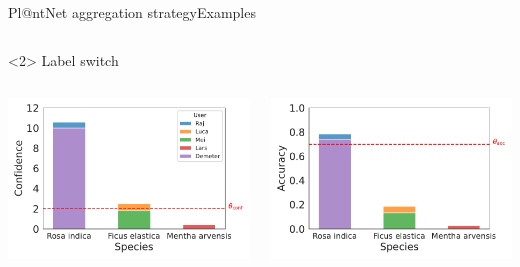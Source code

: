 \begin{frame}{Pl@ntNet aggregation strategy}{Examples}
\begin{onlyenv}
\begin{columns}
\begin{column}{.5\textwidth}
\begin{center}
                \end{center}
            \end{column}
        \end{columns}
    \end{onlyenv}
    \begin{onlyenv}<2>
        Label switch
        \begin{columns}
            \begin{column}{.5\textwidth}
                \begin{center}
                    \includegraphics[width=\textwidth]{./images/histplot_conf_switch.pdf}
                \end{center}
            \end{column}
            \begin{column}{.5\textwidth}
                \begin{center}
                    \includegraphics[width=\textwidth]{./images/histplot_acc_switch.pdf}

\end{center}
\end{column}
\end{columns}
\end{onlyenv}
\end{frame}
